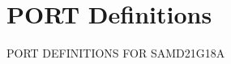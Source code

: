 \hypertarget{group___s_a_m_d21_g18_a__port}{}\section{P\+O\+RT Definitions}
\label{group___s_a_m_d21_g18_a__port}
P\+O\+RT D\+E\+F\+I\+N\+I\+T\+I\+O\+NS F\+OR S\+A\+M\+D21\+G18A 